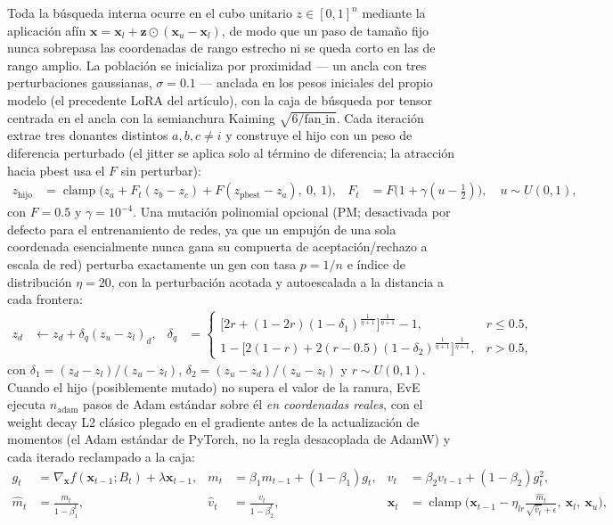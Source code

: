 Toda la búsqueda interna ocurre en el cubo unitario $z \in [0,1]^n$ mediante la aplicación afín $\mathbf{x} = \mathbf{x}_l + \mathbf{z} \odot (\mathbf{x}_u - \mathbf{x}_l)$, de modo que un paso de tamaño fijo nunca sobrepasa las coordenadas de rango estrecho ni se queda corto en las de rango amplio. La población se inicializa por proximidad — un ancla con tres perturbaciones gaussianas, $\sigma = 0.1$ — anclada en los pesos iniciales del propio modelo (el precedente LoRA del artículo), con la caja de búsqueda por tensor centrada en el ancla con la semianchura Kaiming $\sqrt{6/\mathrm{fan\_in}}$. Cada iteración extrae tres donantes distintos $a, b, c \ne i$ y construye el hijo con un peso de diferencia perturbado (el jitter se aplica solo al término de diferencia; la atracción hacia pbest usa el $F$ sin perturbar):
\begin{align}
z_{\text{hijo}} &= \operatorname{clamp}\big(z_a + F_t (z_b - z_c) + F (z_{\text{pbest}} - z_a),\ 0,\ 1\big), &
F_t &= F\big(1 + \gamma (u - \tfrac{1}{2})\big), \quad u \sim U(0,1),
\end{align}
con $F = 0.5$ y $\gamma = 10^{-4}$. Una mutación polinomial opcional (PM; desactivada por defecto para el entrenamiento de redes, ya que un empujón de una sola coordenada esencialmente nunca gana su compuerta de aceptación/rechazo a escala de red) perturba exactamente un gen con tasa $p = 1/n$ e índice de distribución $\eta = 20$, con la perturbación acotada y autoescalada a la distancia a cada frontera:
\begin{align}
z_d &\leftarrow z_d + \delta_q (z_u - z_l)_d, &
\delta_q &=
\begin{cases}
\bigl[2r + (1 - 2r)(1 - \delta_1)^{\frac{1}{\eta+1}}\bigr]^{\frac{1}{\eta+1}} - 1, & r \le 0.5,\\[2pt]
1 - \bigl[2(1 - r) + 2(r - 0.5)(1 - \delta_2)^{\frac{1}{\eta+1}}\bigr]^{\frac{1}{\eta+1}}, & r > 0.5,
\end{cases}
\end{align}
con $\delta_1 = (z_d - z_l)/(z_u - z_l)$, $\delta_2 = (z_u - z_d)/(z_u - z_l)$ y $r \sim U(0,1)$. Cuando el hijo (posiblemente mutado) no supera el valor de la ranura, EvE ejecuta $n_{\text{adam}}$ pasos de Adam estándar sobre él \emph{en coordenadas reales}, con el weight decay L2 clásico plegado en el gradiente antes de la actualización de momentos (el Adam estándar de PyTorch, no la regla desacoplada de AdamW) y cada iterado reclampado a la caja:
\begin{align}
g_t &= \nabla_{\mathbf{x}} f(\mathbf{x}_{t-1}; B_t) + \lambda \mathbf{x}_{t-1}, &
m_t &= \beta_1 m_{t-1} + (1 - \beta_1) g_t, &
v_t &= \beta_2 v_{t-1} + (1 - \beta_2) g_t^2, \\
\widehat{m}_t &= \frac{m_t}{1 - \beta_1^t}, &
\widehat{v}_t &= \frac{v_t}{1 - \beta_2^t}, &
\mathbf{x}_t &= \operatorname{clamp}\Big(\mathbf{x}_{t-1} - \eta_{lr} \frac{\widehat{m}_t}{\sqrt{\widehat{v}_t} + \epsilon},\ \mathbf{x}_l,\ \mathbf{x}_u\Big),
\end{align}

